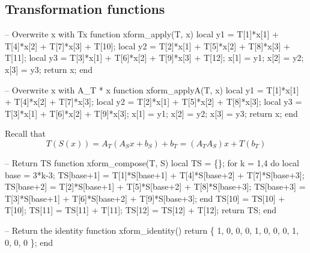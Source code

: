 \subsection{Transformation functions}

\nwenddocs{}\plusendmoddef
-- Overwrite x with Tx
function xform_apply(T, x)
  local y1 = T[1]*x[1] + T[4]*x[2] + T[7]*x[3] + T[10];
  local y2 = T[2]*x[1] + T[5]*x[2] + T[8]*x[3] + T[11];
  local y3 = T[3]*x[1] + T[6]*x[2] + T[9]*x[3] + T[12];
  x[1] = y1;
  x[2] = y2;
  x[3] = y3;
  return x;
end

\nwendcode{}\nwdocspar

\nwenddocs{}\plusendmoddef
-- Overwrite x with A_T * x
function xform_applyA(T, x)
  local y1 = T[1]*x[1] + T[4]*x[2] + T[7]*x[3]; 
  local y2 = T[2]*x[1] + T[5]*x[2] + T[8]*x[3]; 
  local y3 = T[3]*x[1] + T[6]*x[2] + T[9]*x[3];
  x[1] = y1;
  x[2] = y2;
  x[3] = y3;
  return x;
end

\nwendcode{}\nwdocspar

Recall that 
\[
  T(S(x)) = A_T (A_S x + b_S) + b_T = (A_T A_S) x + T(b_T)
\]

\nwenddocs{}\plusendmoddef
-- Return TS
function xform_compose(T, S)
  local TS = \{\};
  for k = 1,4 do
    local base = 3*k-3;
    TS[base+1] = T[1]*S[base+1] + T[4]*S[base+2] + T[7]*S[base+3];
    TS[base+2] = T[2]*S[base+1] + T[5]*S[base+2] + T[8]*S[base+3];
    TS[base+3] = T[3]*S[base+1] + T[6]*S[base+2] + T[9]*S[base+3];
  end
  TS[10] = TS[10] + T[10];
  TS[11] = TS[11] + T[11];
  TS[12] = TS[12] + T[12];
  return TS;
end

\nwendcode{}\nwdocspar

\nwenddocs{}\plusendmoddef
-- Return the identity
function xform_identity()
  return \{ 1, 0, 0,
           0, 1, 0,
           0, 0, 1,
           0, 0, 0 \};
end

\nwendcode{}\nwdocspar

